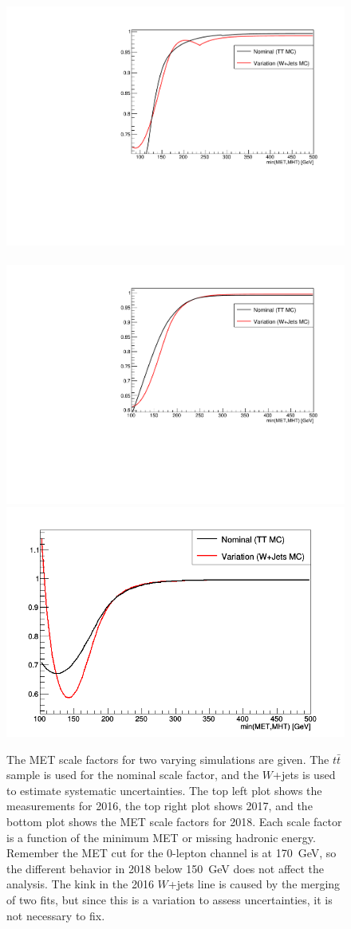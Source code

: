 \begin{figure}
  \centering
  \includegraphics[width=0.5\linewidth]{figures/METSF2016.pdf}~
  \includegraphics[width=0.5\linewidth]{figures/METSF2017.pdf}
  \includegraphics[width=0.5\linewidth]{figures/METSF2018.png}
  \caption[MET trigger scale factors]{
    The MET scale factors for two varying simulations are given.
    The $t\bar{t}$ sample is used for the nominal scale factor,
    and the $W$+jets is used to estimate systematic uncertainties.
    The top left plot shows the measurements for 2016,
    the top right plot shows 2017,
    and the bottom plot shows the MET scale factors for 2018.
    Each scale factor is a function of the minimum MET or missing hadronic energy.
    Remember the MET cut for the 0-lepton channel is at \SI{170}{GeV},
    so the different behavior in 2018 below \SI{150}{GeV} does not affect the analysis.
    The kink in the 2016 $W$+jets line is caused by the merging of two fits,
    but since this is a variation to assess uncertainties, it is not necessary to fix.
  }
  \label{fig:met-sf}
\end{figure}

